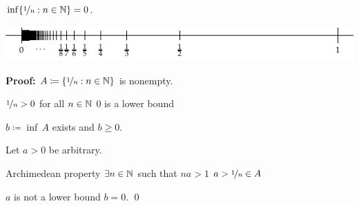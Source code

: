 \documentclass[10pt,aspectratio=149]{beamer}
\begin{document}
\begin{frame}

\begin{corollary}
$\inf \{ \nicefrac{1}{n} : n \in {\mathbb{N}} \} = 0$.
\end{corollary}

\pause

\begin{center}
\includegraphics{../figures/oneovernset.pdf}
\end{center}

\medskip
\pause

\textbf{Proof:}
$A \coloneqq \{ \nicefrac{1}{n} : n \in {\mathbb{N}} \}$ is nonempty.

\medskip
\pause

$\nicefrac{1}{n} > 0$ for all $n \in {\mathbb{N}}$ \wthus $0$ is a lower bound

\medskip
\pause

\thus \quad
$b \coloneqq \inf\, A$ exists and $b \geq 0$.

\medskip
\pause

Let $a > 0$ be arbitrary.

\medskip
\pause

Archimedean property \wthus $\exists n \in {\mathbb{N}}$ such that $na > 1$
\pause
\wthus
$a > \nicefrac{1}{n} \in A$

\medskip
\pause

\thus \quad $a$ is not a lower bound \pause \wthus $b=0$.
\qed

\end{frame}
\end{document}
